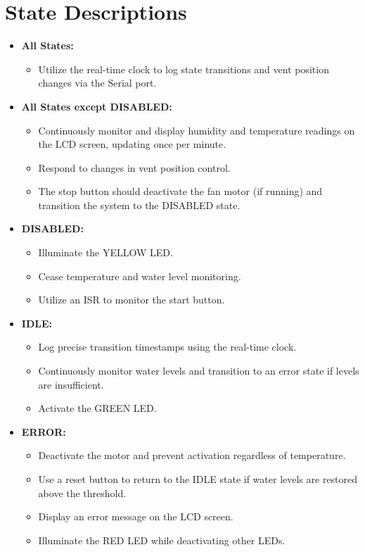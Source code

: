 \documentclass{article}
\begin{document}
\section{State Descriptions}

\begin{itemize}
    \item \textbf{All States:}
    \begin{itemize}
        \item Utilize the real-time clock to log state transitions and vent position changes via the Serial port.
    \end{itemize}

    \item \textbf{All States except DISABLED:}
    \begin{itemize}
        \item Continuously monitor and display humidity and temperature readings on the LCD screen, updating once per minute.
        \item Respond to changes in vent position control.
        \item The stop button should deactivate the fan motor (if running) and transition the system to the DISABLED state.
    \end{itemize}

    \item \textbf{DISABLED:}
    \begin{itemize}
        \item Illuminate the YELLOW LED.
        \item Cease temperature and water level monitoring.
        \item Utilize an ISR to monitor the start button.
    \end{itemize}

    \item \textbf{IDLE:}
    \begin{itemize}
        \item Log precise transition timestamps using the real-time clock.
        \item Continuously monitor water levels and transition to an error state if levels are insufficient.
        \item Activate the GREEN LED.
    \end{itemize}

    \item \textbf{ERROR:}
    \begin{itemize}
        \item Deactivate the motor and prevent activation regardless of temperature.
        \item Use a reset button to return to the IDLE state if water levels are restored above the threshold.
        \item Display an error message on the LCD screen.
        \item Illuminate the RED LED while deactivating other LEDs.
    \end{itemize}


\end{itemize}
\end{document}
